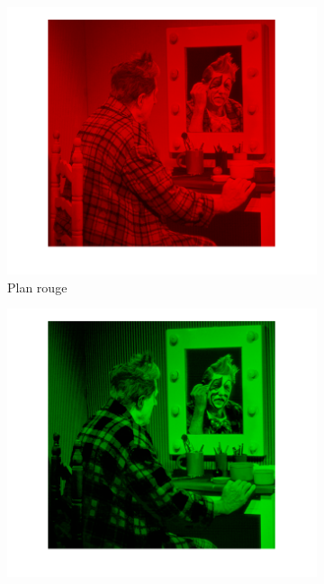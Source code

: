 \documentclass[a4paper]{article}
\begin{document}
\begin{figure}[H]
    \centering
    \begin{subfigure}[c]{0.3\textwidth}
        \centering
        \includegraphics[width=\textwidth]{images/R.png}
        \caption{Plan rouge} 
        \label{subfig:IR}
    \end{subfigure}
    \begin{subfigure}[c]{0.3\textwidth}
        \centering
        \includegraphics[width=\textwidth]{images/G.png}

\end{subfigure}
\end{figure}
\end{document}
